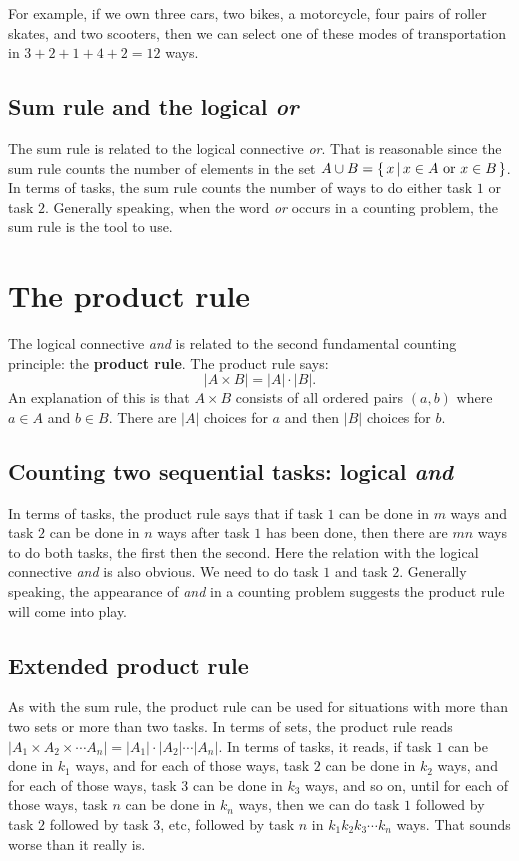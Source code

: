 \begin{exmp}
 For example, if we own three cars, two bikes, a motorcycle, four pairs of roller skates, and
 two scooters, then we can select one of these modes of transportation in 
 $3+2+1+4+2= 12$ ways.
\end{exmp}

\subsection{Sum rule and the logical \textit{or}}
The sum rule is related to the logical connective {\itshape or}. That is reasonable since the
sum rule counts the number of elements in  the set $A\cup B = \{\,x\,|\,x\in A\hbox{ or } x\in B\,\}$.
In terms of tasks, the sum rule counts the number of ways to do either task $1$ or task $2$.
Generally speaking, when the word {\itshape or} occurs in a counting problem, the sum rule
is the tool to use.
\ms
 \section{The product rule}
The logical connective {\itshape and} is related to the second fundamental counting principle:
the {\bfseries product rule}. The product rule says: 
\[
\lvert A\times B \rvert = \lvert A \rvert \cdot \lvert B \rvert.
\] 
An explanation of this
is that $A\times B$ consists of all ordered pairs $(a,b)$ where $a\in A$ and $b\in B$. 
There are $\lvert A \rvert$ choices for $a$ and then $\lvert B \rvert$ choices for $b$. 

\subsection{Counting two sequential tasks: logical \textit{and}}
In terms of tasks, the product rule says that if task $1$ can be done in $m$ ways
 and 
task $2$ can be done in $n$ ways after task $1$ has been done, then there are
$mn$ ways to do both tasks, the first
then the second. Here the relation with the logical connective {\itshape and} is also obvious. We
need to do task $1$ and task $2$. Generally speaking, the appearance of {\itshape and} in a 
counting problem suggests the product rule will come into play.

\subsection{Extended product rule}
As with the sum rule, the product rule can be used for situations with more than two sets
or more than two tasks. In terms of sets, the product rule reads
$\lvert A_1\times A_2\times \cdots A_n \rvert = \lvert A_1\rvert\cdot\lvert A_2 \rvert \cdots \lvert A_n \rvert$. In terms of tasks, it reads,
if task $1$ can be done in $k_1$ ways, and for each of those ways, task $2$ can be done in 
$k_2$ ways, and for each of those ways, task $3$ can be done in $k_3$ ways, and so on, until
for each of those ways, task $n$ can be done in $k_n$ ways, then we can do
task $1$ followed by task $2$ followed by task $3$, etc, followed by task $n$ in
$k_1k_2k_3\cdots k_n$ ways. That sounds worse than it really is.

